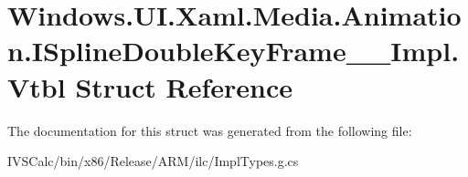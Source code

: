 \hypertarget{struct_windows_1_1_u_i_1_1_xaml_1_1_media_1_1_animation_1_1_i_spline_double_key_frame_____impl_1_1_vtbl}{}\section{Windows.\+U\+I.\+Xaml.\+Media.\+Animation.\+I\+Spline\+Double\+Key\+Frame\+\_\+\+\_\+\+Impl.\+Vtbl Struct Reference}
\label{struct_windows_1_1_u_i_1_1_xaml_1_1_media_1_1_animation_1_1_i_spline_double_key_frame_____impl_1_1_vtbl}


The documentation for this struct was generated from the following file\+:\begin{DoxyCompactItemize}
\item 
I\+V\+S\+Calc/bin/x86/\+Release/\+A\+R\+M/ilc/Impl\+Types.\+g.\+cs\end{DoxyCompactItemize}
